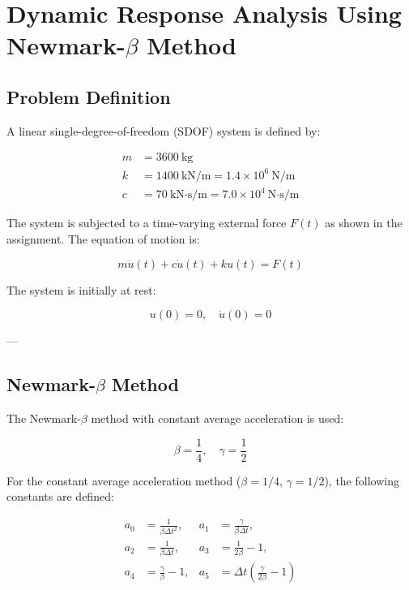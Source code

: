 \section{Dynamic Response Analysis Using Newmark-{$\beta$} Method}

\subsection{Problem Definition}

A linear single-degree-of-freedom (SDOF) system is defined by:

\begin{align}
m &= 3600 \ \text{kg} \\
k &= 1400 \ \text{kN/m} = 1.4 \times 10^6 \ \text{N/m} \\
c &= 70 \ \text{kN·s/m} = 7.0 \times 10^4 \ \text{N·s/m}
\end{align}

The system is subjected to a time-varying external force $F(t)$ as shown in the assignment. 
The equation of motion is:

\begin{equation}
m\ddot{u}(t) + c\dot{u}(t) + ku(t) = F(t)
\end{equation}

The system is initially at rest:

\begin{equation}
u(0) = 0, \quad \dot{u}(0) = 0
\end{equation}

---

\subsection{Newmark-$\beta$ Method}

The Newmark-$\beta$ method with constant average acceleration is used:

\begin{equation}
\beta = \frac{1}{4}, \quad \gamma = \frac{1}{2}
\end{equation}

For the constant average acceleration method ($\beta = 1/4$, $\gamma = 1/2$), the following constants are defined:

\begin{align}
a_0 &= \frac{1}{\beta \Delta t^2}, &
a_1 &= \frac{\gamma}{\beta \Delta t}, \\
a_2 &= \frac{1}{\beta \Delta t}, &
a_3 &= \frac{1}{2\beta} - 1, \\
a_4 &= \frac{\gamma}{\beta} - 1, &
a_5 &= \Delta t \left(\frac{\gamma}{2\beta} - 1\right)
\end{align}


